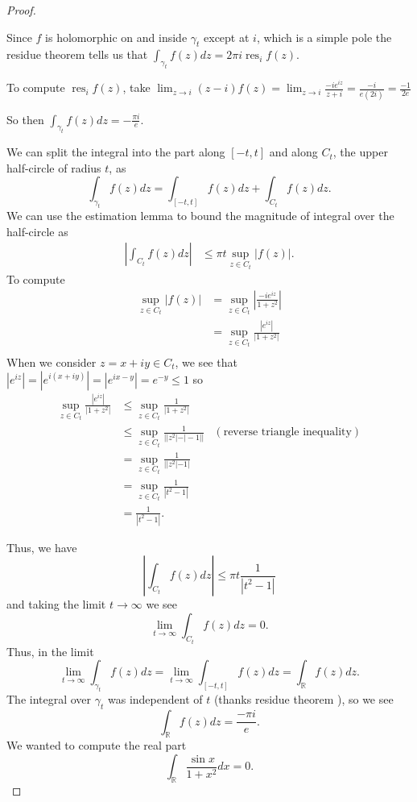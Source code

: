 \documentclass{article}
\DeclareMathOperator{\res}{res}
\begin{document}
\begin{enumerate}
\begin{proof}
\begin{center}
		\end{center}
		
		Since $f$ is holomorphic on and inside $\gamma_t$ except at $i$, which is a simple pole
		the residue theorem tells us that 
		$\int_{\gamma_t} f(z) dz = 2\pi i \res_{i} f(z)$.
		
		To compute $\res_i f(z)$, take $\lim_{z \rightarrow i} (z-i) f(z) = \lim_{z \rightarrow i} \frac{-ie^{iz}}{z+i} = \frac{-i}{e (2i)} =\frac{-1}{2e}$
		
		So then $\int_{\gamma_t} f(z)dz = -\frac{\pi i}{e}$.
		
		We can split the integral into the part along $[-t,t]$ and along $C_t$, the upper half-circle of radius $t$, as
		\[ \int_{\gamma_t} f(z) dz = \int_{[-t,t]} f(z) dz + \int_{C_t} f(z) dz.\]
		We can use the estimation lemma to bound the magnitude of integral over the half-circle as 
		\begin{align*}
			|\int_{C_t} f(z) dz |&\leq \pi t \sup_{z \in C_t} |f(z)|.
		\end{align*}
		To compute 
		\begin{align*}
			\sup_{z \in C_t} |f(z)| &= \sup_{z \in C_t} \left | \frac{-ie^{iz} }{1+z^2} \right |\\
			&= \sup_{z \in C_t} \frac{|e^{iz} |}{|1+z^2|} \\
		\end{align*}
		When we consider $z = x+iy \in C_t$, we see that $|e^{iz}| = |e^{i(x+iy)}| = | e^{ix-y} | = e^{-y} \leq 1$
		so 
		\begin{align*}
			\sup_{z \in C_t} \frac{|e^{iz} |}{|1+z^2|} & \leq \sup_{z \in C_t} \frac{1}{|1+z^2|} \\
			&\leq \sup_{z \in C_t} \frac{1}{||z^2|- |-1||} & (\text{reverse triangle inequality})\\
			&= \sup_{z \in C_t} \frac{1}{| |z^2| - 1|}\\
			&= \sup_{z \in C_t} \frac{1}{| t^2 -1 |}\\
			&= \frac{1}{|t^2-1|}.
		\end{align*}
		
		Thus, we have
		\[ \left |\int_{C_t} f(z) dz \right |\leq \pi t \frac{1}{|t^2-1|}  \]
		and taking the limit $t \rightarrow \infty$ we see
		\[ \lim_{t \rightarrow \infty} \int_{C_t} f(z) dz = 0.\]
		Thus, in the limit
		\[ \lim_{t \rightarrow \infty} \int_{\gamma_t} f(z) dz = \lim_{t \rightarrow \infty} \int_{[-t,t]} f(z) dz = \int_\mathbb{R} f(z) dz.\]
		The integral over $\gamma_t$ was independent of $t$ (thanks residue theorem \smiley{}), so we see
		\[ \int_\mathbb{R} f(z) dz = \frac{-\pi i}{e}.\]
		We wanted to compute the real part
		\[ \int_\mathbb{R} \frac{\sin x}{1+x^2} dx = 0.\]
		

\end{proof}
\end{enumerate}
\end{document}
